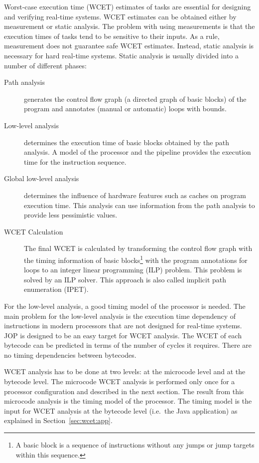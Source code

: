 

Worst-case execution time (WCET) estimates of tasks are essential for
designing and verifying real-time systems. WCET estimates can be
obtained either by measurement or static analysis. The problem with
using measurements is that the execution times of tasks tend to be
sensitive to their inputs. As a rule, measurement does not guarantee
safe WCET estimates. Instead, static analysis is necessary for hard
real-time systems. Static analysis is usually divided into a number
of different phases:
\begin{description}
    \item[Path analysis] generates the control flow graph (a directed
    graph of basic blocks) of the program and annotates (manual or
    automatic) loops with bounds.
    \item[Low-level analysis] determines the execution time of basic
    blocks obtained by the path analysis. A model of the processor
    and the pipeline provides the execution time for the instruction
    sequence.
    \item[Global low-level analysis] determines the influence of
    hardware features such as caches on program execution time. This
    analysis can use information from the path analysis to provide less
    pessimistic values.
    \item[WCET Calculation] The final WCET is calculated by
        transforming the control flow graph with the timing
        information of basic blocks\footnote{A basic block is a
        sequence of instructions without any jumps or jump
        targets within this sequence.} with the program
        annotations for loops to an integer linear programming
        (ILP) problem. This problem is solved by an ILP solver.
        This approach is also called implicit path enumeration
        (IPET).
\end{description}

For the low-level analysis, a good timing model of the processor is
needed. The main problem for the low-level analysis is the execution
time dependency of instructions in modern processors that are not
designed for real-time systems. JOP is designed to be an easy target
for WCET analysis. The WCET of each bytecode can be predicted in
terms of the number of cycles it requires. There are no timing
dependencies between bytecodes.

WCET analysis has to be done at two levels: at the microcode level
and at the bytecode level. The microcode WCET analysis is performed
only once for a processor configuration and described in the next
section. The result from this microcode analysis is the timing model
of the  processor. The timing model is the input for WCET analysis at
the bytecode level (i.e.\ the Java application) as explained in
Section~\ref{sec:wcet:app}.

